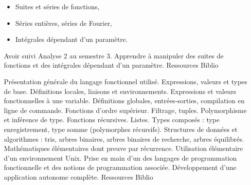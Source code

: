 \documentclass[10pt, a5paper]{report}
\begin{document}
\vfill


{
\begin{itemize} 
  \item Suites et séries de fonctions,
  \item Séries entières, séries de Fourier,
  \item Intégrales dépendant d'un paramètre.
\end{itemize}
}
{Avoir suivi Analyse 2 au semestre 3.}
{Apprendre à manipuler des suites de fonctions et des intégrales dépendant d'un paramètre.}
{Ressources} 
{Biblio} 
 
\vfill


{Présentation générale du langage fonctionnel utilisé. Expressions, valeurs et types de base. Définitions locales, liaisons et environnements. Expressions et valeurs fonctionnelles à une variable. Définitions globales, entrées-sorties, compilation en ligne de commande. Fonctions d'ordre supérieur. Filtrage, tuples. Polymorphisme et inférence de type. Fonctions récursives. Listes. Types composés : type enregistrement, type somme (polymorphes récursifs). Structures de données et algorithmes : tris, arbres binaires, arbres binaires de recherche, arbres équilibrés.}
{Mathématiques élémentaires dont preuve par récurrence. Utilisation élémentaire d'un environnement Unix.}
{Prise en main d'un  des langages de  programmation fonctionnelle et des notions de programmation associée. Développement d'une application autonome complète.} 
{Ressources} 
{Biblio} 
 
\end{document}
